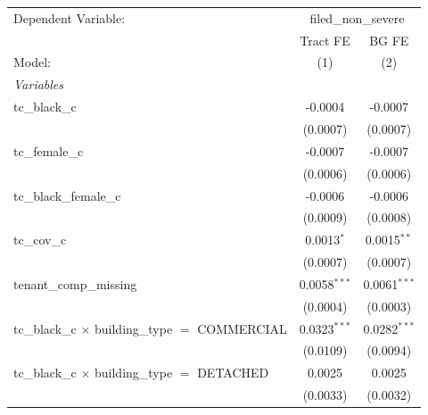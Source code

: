 \begin{tabular}{lcc}
   \tabularnewline \midrule \midrule
   Dependent Variable: & \multicolumn{2}{c}{filed\_non\_severe}\\
                                                                       & Tract FE        & BG FE \\   
   Model:                                                              & (1)             & (2)\\  
   \midrule
   \emph{Variables}\\
   tc\_black\_c                                                        & -0.0004         & -0.0007\\   
                                                                       & (0.0007)        & (0.0007)\\   
   tc\_female\_c                                                       & -0.0007         & -0.0007\\   
                                                                       & (0.0006)        & (0.0006)\\   
   tc\_black\_female\_c                                                & -0.0006         & -0.0006\\   
                                                                       & (0.0009)        & (0.0008)\\   
   tc\_cov\_c                                                          & 0.0013$^{*}$    & 0.0015$^{**}$\\   
                                                                       & (0.0007)        & (0.0007)\\   
   tenant\_comp\_missing                                               & 0.0058$^{***}$  & 0.0061$^{***}$\\   
                                                                       & (0.0004)        & (0.0003)\\   
   tc\_black\_c $\times$ building\_type $=$ COMMERCIAL                 & 0.0323$^{***}$  & 0.0282$^{***}$\\   
                                                                       & (0.0109)        & (0.0094)\\   
   tc\_black\_c $\times$ building\_type $=$ DETACHED                   & 0.0025          & 0.0025\\   
                                                                       & (0.0033)        & (0.0032)\\   

\end{tabular}
